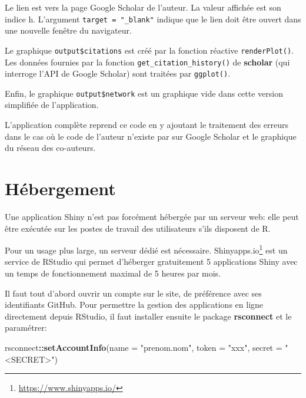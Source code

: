 \documentclass[
  12pt,
  french,
  a4paper,
  extrafontsizes,onecolumn,openright
  ]{memoir}
\newenvironment{Shaded}{\begin{snugshade}}{\end{snugshade}}
\newcommand{\DataTypeTok}[1]{\textcolor[rgb]{0.13,0.29,0.53}{#1}}
\newcommand{\KeywordTok}[1]{\textcolor[rgb]{0.13,0.29,0.53}{\textbf{#1}}}
\newcommand{\NormalTok}[1]{#1}
\newcommand{\OperatorTok}[1]{\textcolor[rgb]{0.81,0.36,0.00}{\textbf{#1}}}
\newcommand{\StringTok}[1]{\textcolor[rgb]{0.31,0.60,0.02}{#1}}
\begin{document}
\normalsize

Le lien est vers la page Google Scholar de l'auteur.
La valeur affichée est son indice h.
L'argument \texttt{target\ =\ "\_blank"} indique que le lien doit être ouvert dans une nouvelle fenêtre du navigateur.

Le graphique \texttt{output\$citations} est créé par la fonction réactive \texttt{renderPlot()}.
Les données fournies par la fonction \texttt{get\_citation\_history()} de \textbf{scholar} (qui interroge l'API de Google Scholar) sont traitées par \texttt{ggplot()}.

Enfin, le graphique \texttt{output\$network} est un graphique vide dans cette version simplifiée de l'application.

L'application complète reprend ce code en y ajoutant le traitement des erreurs dans le cas où le code de l'auteur n'existe par sur Google Scholar et le graphique du réseau des co-auteurs.

\hypertarget{sec:hebergement-shiny}{%
\section{Hébergement}\label{sec:hebergement-shiny}}

Une application Shiny n'est pas forcément hébergée par un serveur web: elle peut être exécutée sur les postes de travail des utilisateurs s'ils disposent de R.

Pour un usage plus large, un serveur dédié est nécessaire.
Shinyapps.io\footnote{\url{https://www.shinyapps.io/}} est un service de RStudio qui permet d'héberger gratuitement 5 applications Shiny avec un temps de fonctionnement maximal de 5 heures par mois.

Il faut tout d'abord ouvrir un compte sur le site, de préférence avec ses identifiants GitHub.
Pour permettre la gestion des applications en ligne directement depuis RStudio, il faut installer ensuite le package \textbf{rsconnect} et le paramétrer:

\scriptsize

\begin{Shaded}
\begin{Highlighting}[]
\NormalTok{rsconnect}\OperatorTok{::}\KeywordTok{setAccountInfo}\NormalTok{(}\DataTypeTok{name =} \StringTok{"prenom.nom"}\NormalTok{, }\DataTypeTok{token =} \StringTok{"xxx"}\NormalTok{,}
    \DataTypeTok{secret =} \StringTok{"<SECRET>"}\NormalTok{)}
\end{Highlighting}
\end{Shaded}
\end{document}
